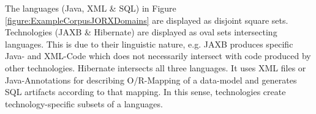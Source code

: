 The languages (\gls{Java}, \gls{XML} \& \gls{SQL}) in Figure \ref{figure:ExampleCorpusJORXDomains} are displayed as disjoint square sets.
Technologies (\gls{JAXB} \& \gls{Hibernate}) are displayed as oval sets intersecting languages.
This is due to their linguistic nature, e.g. \gls{JAXB} produces specific \Gls{Java}- and \gls{XML}-Code which does not necessarily intersect with code produced by other technologies.
\gls{Hibernate} intersects all three languages.
It uses \gls{XML} files or \gls{Java}-Annotations for describing \gls{O/R-Mapping} of a data-model and generates \gls{SQL} artifacts according to that mapping.
In this sense, technologies create technology-specific subsets of a languages.


%
